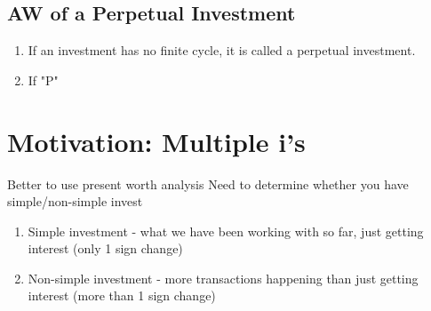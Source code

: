 \documentclass{report} %
\begin{document}
\subsection*{AW of a Perpetual Investment}
\begin{enumerate}
    \item If an investment has no finite cycle, it is called a perpetual investment.
    \item If "P"
\end{enumerate}

\section*{Motivation: Multiple i's}
Better to use present worth analysis
Need to determine whether you have simple/non-simple invest
\begin{enumerate}
    \item Simple investment - what we have been working with so far, just getting interest (only 1 sign change)
    \item Non-simple investment - more transactions happening than just getting interest (more than 1 sign change)
\end{enumerate} 
\end{document}
